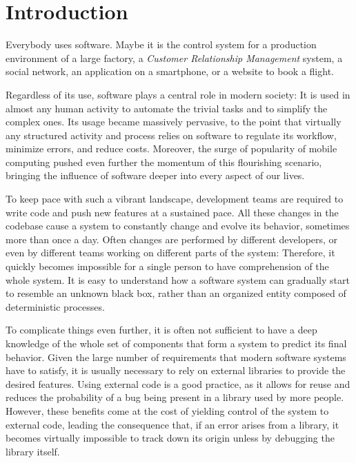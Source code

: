 
\chapter{Introduction}\label{ch:introduction}

Everybody uses software.
Maybe it is the control system for a production environment of a large factory, a \emph{Customer Relationship Management} system, a social network, an application on a smartphone, or a website to book a flight.

Regardless of its use, software plays a central role in modern society: It is used in almost any human activity to automate the trivial tasks and to simplify the complex ones.
Its usage became massively pervasive, to the point that virtually any structured activity and process relies on software to regulate its workflow, minimize errors, and reduce costs.
Moreover, the surge of popularity of mobile computing pushed even further the momentum of this flourishing scenario, bringing the influence of software deeper into every aspect of our lives.

To keep pace with such a vibrant landscape, development teams are required to write code and push new features at a sustained pace.
All these changes in the codebase cause a system to constantly change and evolve its behavior, sometimes more than once a day.
Often changes are performed by different developers, or even by different teams working on different parts of the system: Therefore, it quickly becomes impossible for a single person to have comprehension of the whole system.
It is easy to understand how a software system can gradually start to resemble an unknown black box, rather than an organized entity composed of deterministic processes.

To complicate things even further, it is often not sufficient to have a deep knowledge of the whole set of components that form a system to predict its final behavior.
Given the large number of requirements that modern software systems have to satisfy, it is usually necessary to rely on external libraries to provide the desired features.
Using external code is a good practice, as it allows for reuse and reduces the probability of a bug being present in a library used by more people.
However, these benefits come at the cost of yielding control of the system to external code, leading the consequence that, if an error arises from a library, it becomes virtually impossible to track down its origin unless by debugging the library itself.

